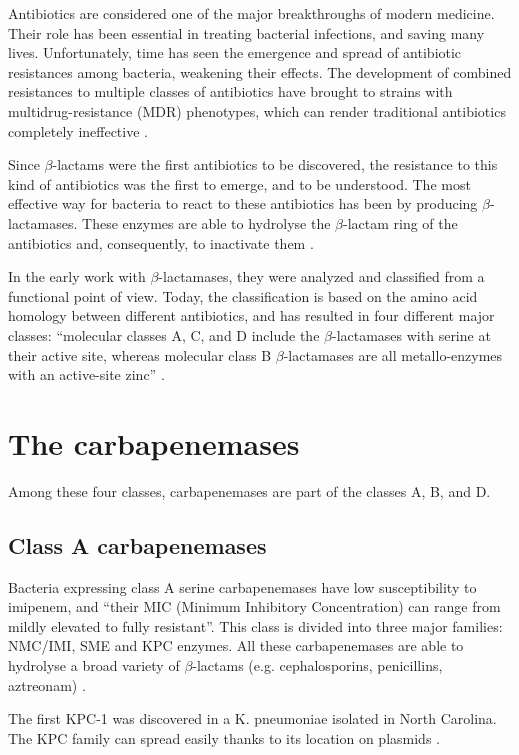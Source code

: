 \documentclass[11pt]{report}
\begin{document}
Antibiotics are considered one of the major breakthroughs of modern medicine. Their role has been essential in treating bacterial infections, and saving many lives. Unfortunately, time has seen the emergence and spread of antibiotic resistances among bacteria, weakening their effects. The development of combined resistances to multiple classes of antibiotics have brought to strains with multidrug-resistance (MDR) phenotypes, which can render traditional antibiotics completely ineffective \cite{Rossolini2014}.


Since $\beta$-lactams were the first antibiotics to be discovered, the resistance to this kind of antibiotics was the first to emerge, and to be understood. The most effective way for bacteria to react to these antibiotics has been by producing $\beta$-lactamases. These enzymes are able to hydrolyse the $\beta$-lactam ring of the antibiotics and, consequently, to inactivate them \cite{KONG2010}.


In the early work with $\beta$-lactamases, they were analyzed and classified from a functional point of view. Today, the classification is based on the amino acid homology between different antibiotics, and has resulted in four different major classes: “molecular classes A, C, and D include the $\beta$-lactamases with serine at their active site, whereas molecular class B $\beta$-lactamases are all metallo-enzymes with an active-site zinc” \cite{Queenan2007}.


\section{The carbapenemases}
Among these four classes, carbapenemases are part of the classes A, B, and D.

\subsection{Class A carbapenemases}
Bacteria expressing class A serine carbapenemases have low susceptibility to imipenem, and “their MIC (Minimum Inhibitory Concentration) can range from mildly elevated to fully resistant”. This class is divided into three major families: NMC/IMI, SME and KPC enzymes.
All these carbapenemases are able to hydrolyse a broad variety of $\beta$-lactams (e.g. cephalosporins, penicillins, aztreonam) \cite{KONG2010} \cite{Queenan2007}.


The first KPC-1 was discovered in a K. pneumoniae isolated  in North Carolina. The KPC family can spread easily thanks to its location on plasmids \cite{Queenan2007}.
\end{document}
